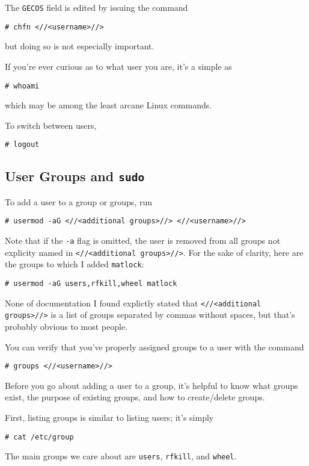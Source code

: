 \documentclass[12pt,letterpaper]{article}
\begin{document}
The \lstinline{GECOS} field is edited by issuing the command
\begin{lstlisting}
# chfn <//<username>//>
\end{lstlisting}
but doing so is not especially important.

If you're ever curious as to what user you are, it's a simple as
\begin{lstlisting}
# whoami
\end{lstlisting}
which may be among the least arcane Linux commands.

To switch between users,
\begin{lstlisting}
# logout
\end{lstlisting}

\subsection{User Groups and \lstinline{sudo}}

To add a user to a group or groups, run
\begin{lstlisting}
# usermod -aG <//<additional groups>//> <//<username>//>
\end{lstlisting}
Note that if the \lstinline{-a} flag is omitted, the user is removed from all groups not explicity named in \lstinline{<//<additional groups>//>}.  For the sake of clarity, here are the groups to which I added \lstinline{matlock}:
\begin{lstlisting}
# usermod -aG users,rfkill,wheel matlock
\end{lstlisting}
None of documentation I found explictly stated that \lstinline{<//<additional groups>//>} is a list of groups separated by commas without spaces, but that's probably obvious to most people.

You can verify that you've properly assigned groups to a user with the command
\begin{lstlisting}
# groups <//<username>//>
\end{lstlisting}

Before you go about adding a user to a group, it's helpful to know what groups exist, the purpose of existing groups, and how to create/delete groups.

First, listing groups is similar to listing users; it's simply
\begin{lstlisting}
# cat /etc/group
\end{lstlisting}
The main groups we care about are \lstinline{users}, \lstinline{rfkill}, and \lstinline{wheel}.
\end{document}
